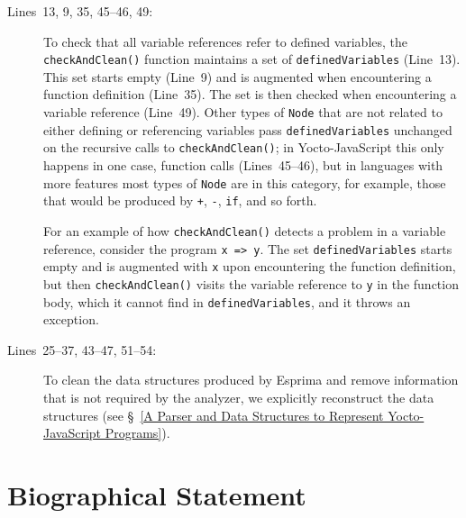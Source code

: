 \documentclass[12pt, oneside]{book}
\begin{document}
\begin{description}
\item [Lines~13, 9, 35, 45–46, 49:]

To check that all variable references refer to defined variables, the \texttt{checkAndClean()} function maintains a set of \texttt{definedVariables} (Line~13). This set starts empty (Line~9) and is augmented when encountering a function definition (Line~35). The set is then checked when encountering a variable reference (Line~49). Other types of \texttt{Node} that are not related to either defining or referencing variables pass \texttt{definedVariables} unchanged on the recursive calls to \texttt{checkAndClean()}; in Yocto-JavaScript this only happens in one case, function calls (Lines~45–46), but in languages with more features most types of \texttt{Node} are in this category, for example, those that would be produced by \texttt{+}, \texttt{-}, \texttt{if}, and so forth.

For an example of how \texttt{checkAndClean()} detects a problem in a variable reference, consider the program \texttt{x => y}. The set \texttt{definedVariables} starts empty and is augmented with \texttt{x} upon encountering the function definition, but then \texttt{checkAndClean()} visits the variable reference to \texttt{y} in the function body, which it cannot find in \texttt{definedVariables}, and it throws an exception.

\item [Lines~25–37, 43–47, 51–54:]

To clean the data structures produced by Esprima and remove information that is not required by the analyzer, we explicitly reconstruct the data structures (see §~\ref{A Parser and Data Structures to Represent Yocto-JavaScript Programs}).
\end{description}

\backmatter




\chapter{Biographical Statement}

\end{document}
